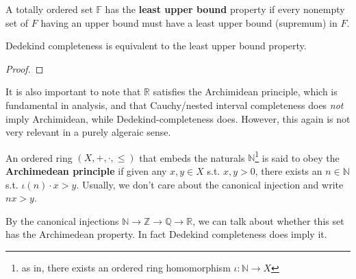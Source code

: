   \begin{definition}
    A totally ordered set $\mathbb{F}$ has the \textbf{least upper bound} property if every nonempty set of $F$ having an upper bound must have a least upper bound (supremum) in $F$. 
  \end{definition} 

  \begin{theorem}
    Dedekind completeness is equivalent to the least upper bound property. 
  \end{theorem}
  \begin{proof}
    
  \end{proof}

  It is also important to note that $\mathbb{R}$ satisfies the Archimidean principle, which is fundamental in analysis, and that Cauchy/nested interval completeness does \textit{not} imply Archimidean, while Dedekind-completeness does. However, this again is not very relevant in a purely algeraic sense. 

  \begin{definition}
    An ordered ring $(X, +, \cdot, \leq)$ that embeds the naturals $\mathbb{N}$\footnote{as in, there exists an ordered ring homomorphism $\iota: \mathbb{N} \rightarrow X$} is said to obey the \textbf{Archimedean principle} if given any $x, y \in X$ s.t. $x, y > 0$, there exists an $n \in \mathbb{N}$ s.t. $\iota(n) \cdot x > y$. Usually, we don't care about the canonical injection and write $nx > y$. 
  \end{definition}

  By the canonical injections $\mathbb{N} \rightarrow \mathbb{Z} \rightarrow \mathbb{Q} \rightarrow \mathbb{R}$, we can talk about whether this set has the Archimedean property. In fact Dedekind completeness does imply it. 

